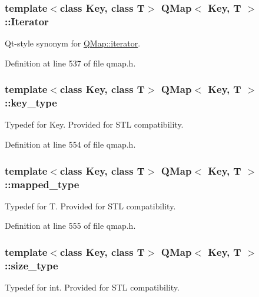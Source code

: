 \subsubsection[{\texorpdfstring{Iterator}{Iterator}}]{\setlength{\rightskip}{0pt plus 5cm}template$<$class Key, class T$>$ {\bf Q\+Map}$<$ Key, T $>$\+::{\bf Iterator}}\hypertarget{class_q_map_a1e3d75b555f8e9c0f8cf4043d179e15c}{}\label{class_q_map_a1e3d75b555f8e9c0f8cf4043d179e15c}
Qt-\/style synonym for \hyperlink{class_q_map_1_1iterator}{Q\+Map\+::iterator}. 

Definition at line 537 of file qmap.\+h.

\subsubsection[{\texorpdfstring{key\+\_\+type}{key_type}}]{\setlength{\rightskip}{0pt plus 5cm}template$<$class Key, class T$>$ {\bf Q\+Map}$<$ Key, T $>$\+::{\bf key\+\_\+type}}\hypertarget{class_q_map_aefd494f0aa5fde13a2740aa83ae33386}{}\label{class_q_map_aefd494f0aa5fde13a2740aa83ae33386}
Typedef for Key. Provided for S\+TL compatibility. 

Definition at line 554 of file qmap.\+h.

\subsubsection[{\texorpdfstring{mapped\+\_\+type}{mapped_type}}]{\setlength{\rightskip}{0pt plus 5cm}template$<$class Key, class T$>$ {\bf Q\+Map}$<$ Key, T $>$\+::{\bf mapped\+\_\+type}}\hypertarget{class_q_map_a8d473df53a41e0a8fb1f4490951b6f43}{}\label{class_q_map_a8d473df53a41e0a8fb1f4490951b6f43}
Typedef for T. Provided for S\+TL compatibility. 

Definition at line 555 of file qmap.\+h.

\subsubsection[{\texorpdfstring{size\+\_\+type}{size_type}}]{\setlength{\rightskip}{0pt plus 5cm}template$<$class Key, class T$>$ {\bf Q\+Map}$<$ Key, T $>$\+::{\bf size\+\_\+type}}\hypertarget{class_q_map_a6c8551f9c925b9e5dc73129fc1609c90}{}\label{class_q_map_a6c8551f9c925b9e5dc73129fc1609c90}
Typedef for int. Provided for S\+TL compatibility. 

